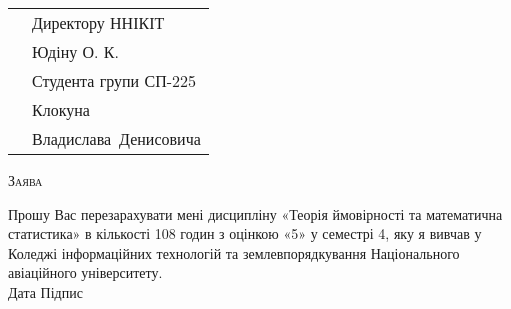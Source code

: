 \documentclass[a4paper,oneside,DIV=9,12pt]{scrartcl}
\begin{document}
	\pagestyle{empty}
%		
	
	\begin{tabular}{p{228pt}l}
		& Директору ННІКІТ\\
		& Юдіну О. К.\\
		& Студента групи СП-225\\
		& Клокуна\\
		& Владислава~Денисовича\\
	\end{tabular}
	
	\begin{center}
	\textsc{Заява}
	\end{center}
	
	Прошу Вас перезарахувати мені дисципліну «Теорія ймовірності та математична статистика» в кількості 108 годин з оцінкою «5» у семестрі 4, яку я вивчав у Коледжі інформаційних технологій та землевпорядкування Національного авіаційного університету.\\[\baselineskip]
	
	\noindent Дата \hspace{\fill} Підпис
	
\end{document}
